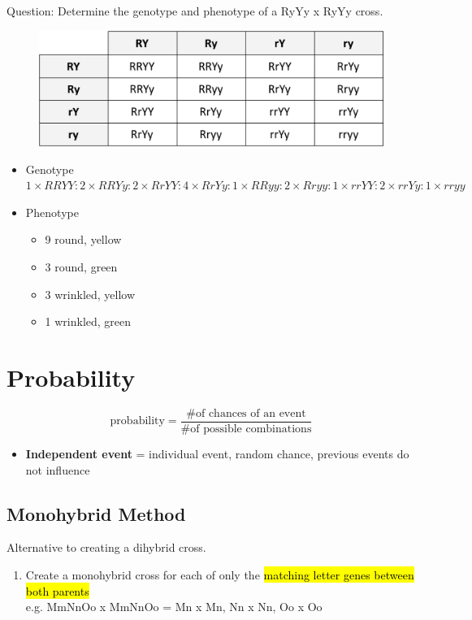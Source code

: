 \documentclass[a4paper,12pt]{article}
\begin{document}
Question: Determine the genotype and phenotype of a RyYy x RyYy cross.

\begin{figure}[H]
    \centering
    \includegraphics[width=\textwidth]{dihybrid}
\end{figure}

\begin{itemize}
    \item{Genotype \\ $1 \times RRYY : 2 \times RRYy : 2 \times RrYY : 4 \times RrYy : 1 \times RRyy : 2 \times Rryy : 1 \times rrYY : 2 \times rrYy : 1 \times rryy$}
    \item{
            Phenotype
            \begin{itemize}
                \item{9 round, yellow}
                \item{3 round, green}
                \item{3 wrinkled, yellow}
                \item{1 wrinkled, green}
            \end{itemize}
        }
\end{itemize}

\pagebreak

\section{Probability}
$$\textrm{probability} = \frac{\textrm{\# of chances of an event}}{\textrm{\# of possible combinations}}$$
\begin{itemize}
    \item{\textbf{Independent event} = individual event, random chance, previous events do not influence}
\end{itemize}

\subsection{Monohybrid Method}
Alternative to creating a dihybrid cross.
\begin{enumerate}
    \item{Create a monohybrid cross for each of only the \hl{matching letter genes between both parents} \\ e.g. MmNnOo x MmNnOo = Mn x Mn, Nn x Nn, Oo x Oo}
\end{enumerate}
\end{document}
